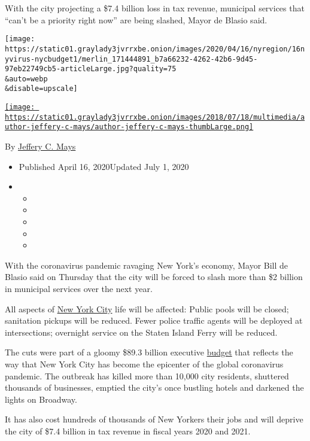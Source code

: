 With the city projecting a \$7.4 billion loss in tax revenue, municipal
services that ``can't be a priority right now'' are being slashed, Mayor
de Blasio said.

\texttt{[image: https://static01.graylady3jvrrxbe.onion/images/2020/04/16/nyregion/16nyvirus-nycbudget1/merlin\_171444891\_b7a66232-4262-42b6-9d45-97eb22749cb5-articleLarge.jpg?quality=75\\\&auto=webp\\\&disable=upscale]}

\href{https://www.nytimes3xbfgragh.onion/by/jeffery-c-mays}{\texttt{[image: https://static01.graylady3jvrrxbe.onion/images/2018/07/18/multimedia/author-jeffery-c-mays/author-jeffery-c-mays-thumbLarge.png]}}

By \href{https://www.nytimes3xbfgragh.onion/by/jeffery-c-mays}{Jeffery
C. Mays}

\begin{itemize}
\item
  Published April 16, 2020Updated July 1, 2020
\item
  \begin{itemize}
  \item
  \item
  \item
  \item
  \item
  \end{itemize}
\end{itemize}

With the coronavirus pandemic ravaging New York's economy, Mayor Bill de
Blasio said on Thursday that the city will be forced to slash more than
\$2 billion in municipal services over the next year.

All aspects of
\href{https://www.nytimes3xbfgragh.onion/2020/07/01/nyregion/nyc-budget-cuts.html}{New
York City} life will be affected: Public pools will be closed;
sanitation pickups will be reduced. Fewer police traffic agents will be
deployed at intersections; overnight service on the Staten Island Ferry
will be reduced.

The cuts were part of a gloomy \$89.3 billion executive
\href{https://www.nytimes3xbfgragh.onion/2020/07/01/nyregion/nyc-budget-cuts.html}{budget}
that reflects the way that New York City has become the epicenter of the
global coronavirus pandemic. The outbreak has killed more than 10,000
city residents, shuttered thousands of businesses, emptied the city's
once bustling hotels and darkened the lights on Broadway.

It has also cost hundreds of thousands of New Yorkers their jobs and
will deprive the city of \$7.4 billion in tax revenue in fiscal years
2020 and 2021.

